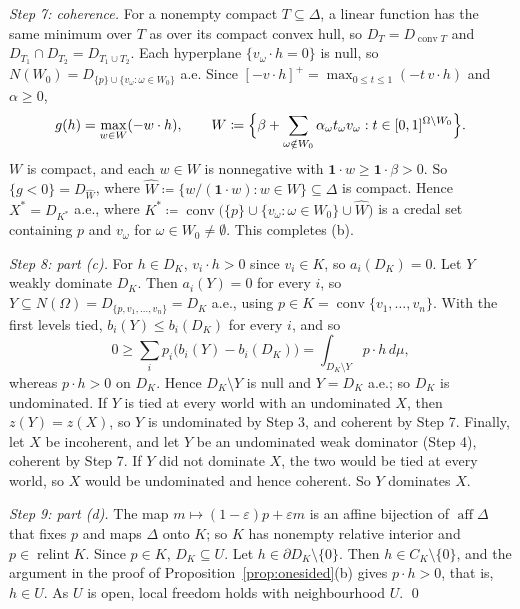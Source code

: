 \documentclass[11pt]{article}
\newcommand{\one}{\mathbf{1}}
\DeclareMathOperator{\conv}{conv}
\DeclareMathOperator{\relint}{relint}
\DeclareMathOperator{\aff}{aff}
\theoremstyle{plain}
\theoremstyle{definition}
\theoremstyle{remark}
\begin{document}
\emph{Step 7: coherence.} For a nonempty compact $T\subseteq\Delta$, a linear function has the
same minimum over $T$ as over its compact convex hull, so $D_T=D_{\conv T}$ and $D_{T_1}\cap
D_{T_2}=D_{T_1\cup T_2}$. Each hyperplane $\{v_\omega\cdot h=0\}$ is null, so $N(W_0)=
D_{\{p\}\cup\{v_\omega:\omega\in W_0\}}$ a.e. Since $[-v\cdot h]^+=\max_{0\le t\le1}(-t\,v\cdot
h)$ and $\alpha\ge0$,
\[
  g(h)=\max_{w\in W}(-w\cdot h),\qquad W\coloneqq\Bigl\{\beta+\sum_{\omega\notin W_0}
  \alpha_\omega t_\omega v_\omega:t\in[0,1]^{\Omega\setminus W_0}\Bigr\}.
\]
$W$ is compact, and each $w\in W$ is nonnegative with $\one\cdot w\ge\one\cdot\beta>0$. So
$\{g<0\}=D_{\hat W}$, where $\hat W\coloneqq\{w/(\one\cdot w):w\in W\}\subseteq\Delta$ is
compact. Hence $X^\ast=D_{K^\ast}$ a.e., where $K^\ast\coloneqq\conv
\bigl(\{p\}\cup\{v_\omega:\omega\in W_0\}\cup\hat W\bigr)$ is a credal set containing $p$ and
$v_\omega$ for $\omega\in W_0\ne\emptyset$. This completes (b).

\emph{Step 8: part (c).} For $h\in D_K$, $v_i\cdot h>0$ since $v_i\in K$, so $a_i(D_K)=0$. Let
$Y$ weakly dominate $D_K$. Then $a_i(Y)=0$ for every $i$, so $Y\subseteq N(\Omega)=D_{\{p,v_1,
\dots,v_n\}}=D_K$ a.e., using $p\in K=\conv\{v_1,\dots,v_n\}$. With the first levels tied,
$b_i(Y)\le b_i(D_K)$ for every $i$, and so
\[
  0\ge\sum_ip_i\bigl(b_i(Y)-b_i(D_K)\bigr)=\int_{D_K\setminus Y}p\cdot h\,d\mu ,
\]
whereas $p\cdot h>0$ on $D_K$. Hence $D_K\setminus Y$ is null and $Y=D_K$ a.e.; so $D_K$ is
undominated. If $Y$ is tied at every world with an undominated $X$, then $z(Y)=z(X)$, so $Y$ is
undominated by Step 3, and coherent by Step 7. Finally, let $X$ be incoherent, and let $Y$ be an
undominated weak dominator (Step 4), coherent by Step 7. If $Y$ did not dominate $X$, the two
would be tied at every world, so $X$ would be undominated and hence coherent. So $Y$ dominates
$X$.

\emph{Step 9: part (d).} The map $m\mapsto(1-\varepsilon)p+\varepsilon m$ is an affine bijection
of $\aff\Delta$ that fixes $p$ and maps $\Delta$ onto $K$; so $K$ has nonempty relative
interior and $p\in\relint K$. Since $p\in K$, $D_K\subseteq U$. Let $h\in\partial D_K\setminus
\{0\}$. Then $h\in C_K\setminus\{0\}$, and the argument in the proof of
Proposition~\ref{prop:onesided}(b) gives $p\cdot h>0$, that is, $h\in U$. As $U$ is open, local
freedom holds with neighbourhood $U$.
\qed
\end{document}
